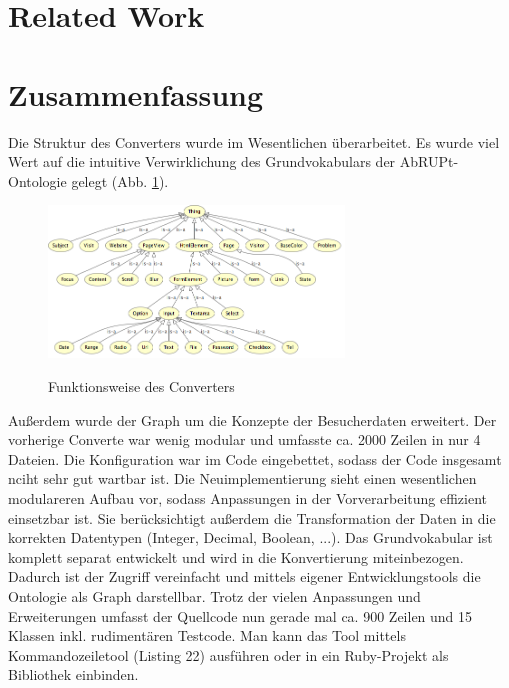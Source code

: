 \documentclass[runningheads,a4paper]{llncs}
\begin{document}


\section{Related Work}
\label{sec:related_work}

\section{Zusammenfassung}
\label{sec:conclusion}

Die Struktur des Converters wurde im Wesentlichen überarbeitet.
Es wurde viel Wert auf die intuitive Verwirklichung des Grundvokabulars der AbRUPt-Ontologie gelegt (Abb. \ref{fig:onto}).

\begin{figure}
\caption{Funktionsweise des Converters}
\centering
\includegraphics[width=0.7\textwidth]{figures/tbox}
\label{fig:onto}
\end{figure}

Außerdem wurde der Graph um die Konzepte der Besucherdaten erweitert.
Der vorherige Converte war wenig modular und umfasste ca. 2000 Zeilen in nur 4 Dateien.
Die Konfiguration war im Code eingebettet, sodass der Code insgesamt nciht sehr gut wartbar ist.
Die Neuimplementierung sieht einen wesentlichen modulareren Aufbau vor, sodass Anpassungen in der Vorverarbeitung effizient einsetzbar ist.
Sie berücksichtigt außerdem die Transformation der Daten in die korrekten Datentypen (Integer, Decimal, Boolean, ...).
Das Grundvokabular ist komplett separat entwickelt und wird in die Konvertierung miteinbezogen.
Dadurch ist der Zugriff vereinfacht und mittels eigener Entwicklungstools die Ontologie als Graph darstellbar.
Trotz der vielen Anpassungen und Erweiterungen umfasst der Quellcode nun gerade mal ca. 900 Zeilen und 15 Klassen inkl. rudimentären Testcode.
Man kann das Tool mittels Kommandozeiletool (Listing 22) ausführen oder in ein Ruby-Projekt als Bibliothek einbinden.
\end{document}
